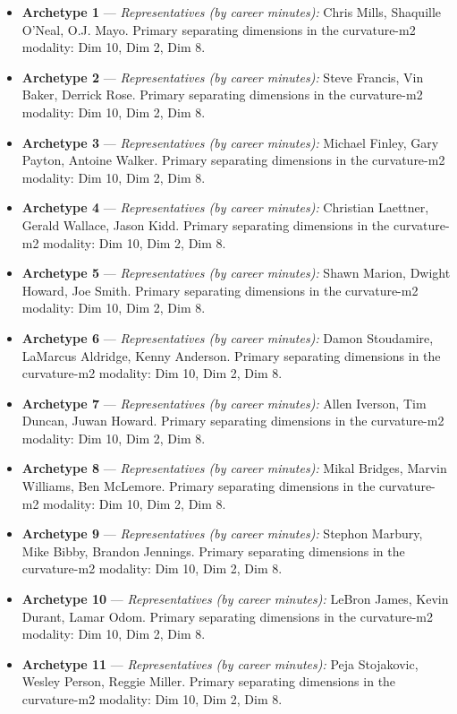 \begin{itemize}
\item \textbf{Archetype 1} --- \emph{Representatives (by career minutes):} Chris Mills, Shaquille O'Neal, O.J. Mayo. Primary separating dimensions in the curvature-m2 modality: Dim 10, Dim 2, Dim 8.
\item \textbf{Archetype 2} --- \emph{Representatives (by career minutes):} Steve Francis, Vin Baker, Derrick Rose. Primary separating dimensions in the curvature-m2 modality: Dim 10, Dim 2, Dim 8.
\item \textbf{Archetype 3} --- \emph{Representatives (by career minutes):} Michael Finley, Gary Payton, Antoine Walker. Primary separating dimensions in the curvature-m2 modality: Dim 10, Dim 2, Dim 8.
\item \textbf{Archetype 4} --- \emph{Representatives (by career minutes):} Christian Laettner, Gerald Wallace, Jason Kidd. Primary separating dimensions in the curvature-m2 modality: Dim 10, Dim 2, Dim 8.
\item \textbf{Archetype 5} --- \emph{Representatives (by career minutes):} Shawn Marion, Dwight Howard, Joe Smith. Primary separating dimensions in the curvature-m2 modality: Dim 10, Dim 2, Dim 8.
\item \textbf{Archetype 6} --- \emph{Representatives (by career minutes):} Damon Stoudamire, LaMarcus Aldridge, Kenny Anderson. Primary separating dimensions in the curvature-m2 modality: Dim 10, Dim 2, Dim 8.
\item \textbf{Archetype 7} --- \emph{Representatives (by career minutes):} Allen Iverson, Tim Duncan, Juwan Howard. Primary separating dimensions in the curvature-m2 modality: Dim 10, Dim 2, Dim 8.
\item \textbf{Archetype 8} --- \emph{Representatives (by career minutes):} Mikal Bridges, Marvin Williams, Ben McLemore. Primary separating dimensions in the curvature-m2 modality: Dim 10, Dim 2, Dim 8.
\item \textbf{Archetype 9} --- \emph{Representatives (by career minutes):} Stephon Marbury, Mike Bibby, Brandon Jennings. Primary separating dimensions in the curvature-m2 modality: Dim 10, Dim 2, Dim 8.
\item \textbf{Archetype 10} --- \emph{Representatives (by career minutes):} LeBron James, Kevin Durant, Lamar Odom. Primary separating dimensions in the curvature-m2 modality: Dim 10, Dim 2, Dim 8.
\item \textbf{Archetype 11} --- \emph{Representatives (by career minutes):} Peja Stojakovic, Wesley Person, Reggie Miller. Primary separating dimensions in the curvature-m2 modality: Dim 10, Dim 2, Dim 8.
\end{itemize}

